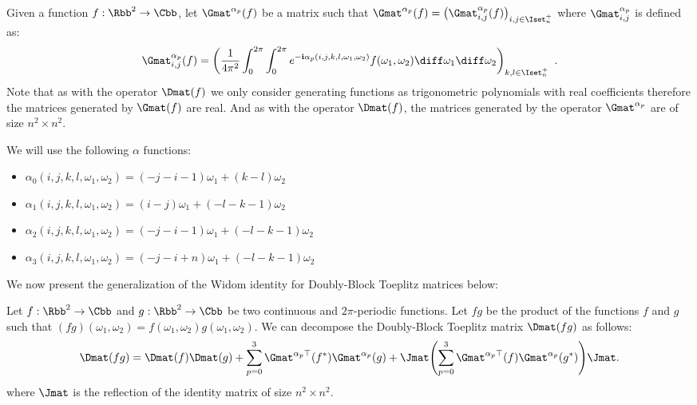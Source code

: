 Given a function $f:\Rbb^2 \rightarrow \Cbb$, let $\Gmat^{\alpha_p} (f)$ be a matrix such that $\Gmat^{\alpha_p} (f) = \leftmat \Gmat^{\alpha_p}_{i,j}(f) \rightmat_{i,j \in \Iset^+_n}$ where $\Gmat^{\alpha_p}_{i,j}$ is defined as:
\begin{equation}
  \Gmat^{\alpha_p}_{i,j}(f) =\leftmat \frac{1}{4\pi^{2}} \int_{0}^{2\pi} \int_{0}^{2\pi} e^{-\ci \alpha_p(i, j, k, l, \omega_1, \omega_2)} f(\omega_{1},\omega_{2}) \diff \omega_{1} \diff \omega_{2}
  \rightmat_{k,l \in \Iset^+_n} \enspace.
\end{equation}
Note that as with the operator $\Dmat(f)$ we only consider generating functions as trigonometric polynomials with real coefficients therefore the matrices generated by $\Gmat(f)$ are real. 
And as with the operator $\Dmat(f)$, the matrices generated by the operator $\Gmat^{\alpha_p}$ are of size $n^2 \times n^2$. 

\noindent
We will use the following $\alpha$ functions:
\begin{itemize}
    \item[] $\alpha_0(i, j, k, l, \omega_1, \omega_2) = (-j-i-1)\omega_1 + (k-l)\omega_2$
    \item[] $\alpha_1(i, j, k, l, \omega_1, \omega_2) = (i-j)\omega_1 + (-l-k-1)\omega_2$
    \item[] $\alpha_2(i, j, k, l, \omega_1, \omega_2) = (-j-i-1)\omega_1 + (-l-k-1)\omega_2$
    \item[] $\alpha_3(i, j, k, l, \omega_1, \omega_2) = (-j-i+n)\omega_1 + (-l-k-1)\omega_2$
\end{itemize}

\noindent
We now present the generalization of the Widom identity for Doubly-Block Toeplitz matrices below:
\begin{lemma} \label{lemma:ch5-widom_idenity}
  Let $f:\Rbb^2 \rightarrow \Cbb$ and $g:\Rbb^2 \rightarrow \Cbb$ be two continuous and $2\pi$-periodic functions. 
  Let $fg$ be the product of the functions $f$ and $g$ such that $(fg)(\omega_1, \omega_2) = f(\omega_1, \omega_2) g(\omega_1, \omega_2)$.
  We can decompose the Doubly-Block Toeplitz matrix $\Dmat(fg)$ as follows:
  \begin{equation}
      \Dmat(fg) = \Dmat(f)\Dmat(g) + \sum_{p=0}^3 \Gmat^{\alpha_p \top}(f^*) \Gmat^{\alpha_p}(g) + \Jmat \left( \sum_{p=0}^3 \Gmat^{\alpha_p \top}(f) \Gmat^{\alpha_p }(g^*) \right) \Jmat.
  \end{equation}
  where $\Jmat$ is the reflection of the identity matrix of size $n^2 \times n^2$.
\end{lemma}

